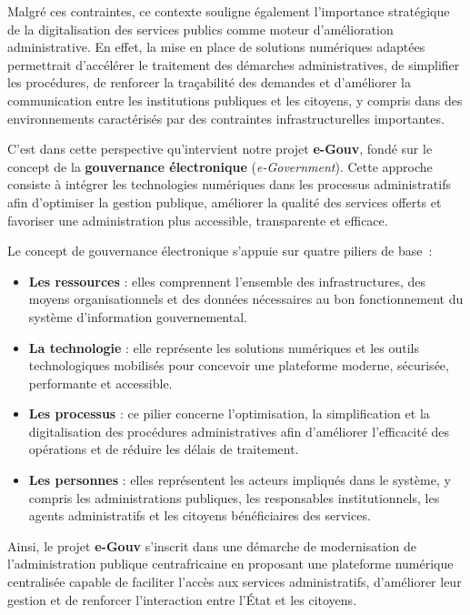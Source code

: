 Malgré ces contraintes, ce contexte souligne également l’importance stratégique de la digitalisation des services publics comme moteur d’amélioration administrative. En effet, la mise en place de solutions numériques adaptées permettrait d’accélérer le traitement des démarches administratives, de simplifier les procédures, de renforcer la traçabilité des demandes et d’améliorer la communication entre les institutions publiques et les citoyens, y compris dans des environnements caractérisés par des contraintes infrastructurelles importantes.

C’est dans cette perspective qu’intervient notre projet \textbf{e-Gouv}, fondé sur le concept de la \textbf{gouvernance électronique} (\textit{e-Government}). Cette approche consiste à intégrer les technologies numériques dans les processus administratifs afin d’optimiser la gestion publique, améliorer la qualité des services offerts et favoriser une administration plus accessible, transparente et efficace.

Le concept de gouvernance électronique s’appuie sur quatre piliers de base :

\begin{itemize}
    \item \textbf{Les ressources} : elles comprennent l’ensemble des infrastructures, des moyens organisationnels et des données nécessaires au bon fonctionnement du système d’information gouvernemental.

    \item \textbf{La technologie} : elle représente les solutions numériques et les outils technologiques mobilisés pour concevoir une plateforme moderne, sécurisée, performante et accessible.

    \item \textbf{Les processus} : ce pilier concerne l’optimisation, la simplification et la digitalisation des procédures administratives afin d’améliorer l’efficacité des opérations et de réduire les délais de traitement.

    \item \textbf{Les personnes} : elles représentent les acteurs impliqués dans le système, y compris les administrations publiques, les responsables institutionnels, les agents administratifs et les citoyens bénéficiaires des services.
\end{itemize}

Ainsi, le projet \textbf{e-Gouv} s’inscrit dans une démarche de modernisation de l’administration publique centrafricaine en proposant une plateforme numérique centralisée capable de faciliter l’accès aux services administratifs, d’améliorer leur gestion et de renforcer l’interaction entre l’État et les citoyens.



